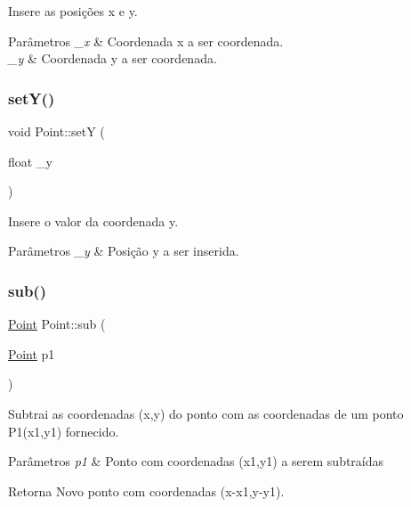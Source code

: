 Insere as posições x e y. 


\begin{DoxyParams}{Parâmetros}
{\em \+\_\+x} & Coordenada x a ser coordenada. \\
\hline
{\em \+\_\+y} & Coordenada y a ser coordenada. \\
\hline
\end{DoxyParams}
\mbox{\label{class_point_a9868c4601b0ea0c2d0de20fe41ee0e49}} 
\subsubsection{\texorpdfstring{set\+Y()}{setY()}}
{\footnotesize\ttfamily void Point\+::setY (\begin{DoxyParamCaption}\item[{float}]{\+\_\+y }\end{DoxyParamCaption})}



Insere o valor da coordenada y. 


\begin{DoxyParams}{Parâmetros}
{\em \+\_\+y} & Posição y a ser inserida. \\
\hline
\end{DoxyParams}
\mbox{\label{class_point_a9cf2c53b0a4e6282a6712824bb4e9b00}} 
\subsubsection{\texorpdfstring{sub()}{sub()}}
{\footnotesize\ttfamily \hyperlink{class_point}{Point} Point\+::sub (\begin{DoxyParamCaption}\item[{\hyperlink{class_point}{Point}}]{p1 }\end{DoxyParamCaption})}



Subtrai as coordenadas (x,y) do ponto com as coordenadas de um ponto P1(x1,y1) fornecido. 


\begin{DoxyParams}{Parâmetros}
{\em p1} & Ponto com coordenadas (x1,y1) a serem subtraídas \\
\hline
\end{DoxyParams}
\begin{DoxyReturn}{Retorna}
Novo ponto com coordenadas (x-\/x1,y-\/y1). 
\end{DoxyReturn}
\mbox{\label{class_point_ad9676e36f3444534b609e3c68422239a}} 
